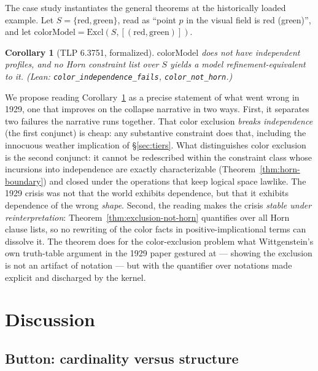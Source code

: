 \documentclass[10pt, letterpaper]{article}
\newtheorem{corollary}[theorem]{Corollary}
\theoremstyle{remark}
\newcommand{\lean}[1]{\texttt{#1}}
\begin{document}
The case study instantiates the general theorems at the historically loaded
example. Let $S = \{\mathrm{red}, \mathrm{green}\}$, read as ``point $p$ in
the visual field is red (green)'', and let
$\mathrm{colorModel} = \mathrm{Excl}(S, [(\mathrm{red}, \mathrm{green})])$.

\begin{corollary}[TLP 6.3751, formalized]\label{cor:color}
$\mathrm{colorModel}$ does not have independent profiles, and no Horn
constraint list over $S$ yields a model refinement-equivalent to it. (Lean:
\lean{color\_independence\_fails}, \lean{color\_not\_horn}.)
\end{corollary}

We propose reading Corollary~\ref{cor:color} as a precise statement of what
went wrong in 1929, one that improves on the collapse narrative in two ways.
First, it separates two failures the narrative runs together. That color
exclusion \emph{breaks independence} (the first conjunct) is cheap: any
substantive constraint does that, including the innocuous weather
implication of \S\ref{sec:tiers}. What distinguishes color exclusion is the
second conjunct: it cannot be redescribed within the constraint class whose
incursions into independence are exactly characterizable
(Theorem~\ref{thm:horn-boundary}) and closed under the operations that keep
logical space lawlike. The 1929 crisis was not that the world exhibits
dependence, but that it exhibits dependence of the wrong \emph{shape}.
Second, the reading makes the crisis \emph{stable under reinterpretation}:
Theorem~\ref{thm:exclusion-not-horn} quantifies over all Horn clause lists,
so no rewriting of the color facts in positive-implicational terms can
dissolve it. The theorem does for the color-exclusion problem what
Wittgenstein's own truth-table argument in the 1929 paper gestured at ---
showing the exclusion is not an artifact of notation --- but with the
quantifier over notations made explicit and discharged by the kernel.

\section{Discussion}\label{sec:discussion}

\subsection{Button: cardinality versus structure}
\end{document}
